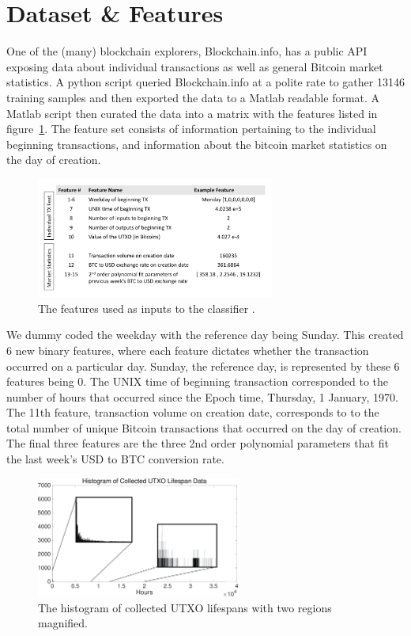 \documentclass[11pt]{article}
\begin{document}
\section{Dataset \& Features}
One of the (many) blockchain explorers, Blockchain.info, has a public API exposing data about individual transactions as well as general Bitcoin market statistics. A python script queried Blockchain.info at a polite rate to gather 13146 training samples and then exported the data to a Matlab readable format. A Matlab script then curated the data into a matrix with the features listed in figure~\ref{features}. The feature set consists of information pertaining to the individual beginning transactions, and information about the bitcoin market statistics on the day of creation.



\begin{figure}
\begin{center}
\includegraphics[width=0.7\textwidth]{figures/features}
\end{center}
\caption{The features used as inputs to the classifier .}
\label{features}
\end{figure}



We dummy coded the weekday with the reference day being Sunday. This created 6 new binary features, where each feature dictates whether the transaction occurred on a particular day. Sunday, the reference day, is represented by these 6 features being 0. The UNIX time of beginning transaction corresponded to the number of hours that occurred since the Epoch time, Thursday, 1 January, 1970. The 11th feature, transaction volume on creation date, corresponds to to the total number of unique Bitcoin transactions that occurred on the day of creation. The final three features are the three 2nd order polynomial parameters that fit the last week's USD to BTC conversion rate.


\begin{figure}
\begin{center}
\includegraphics[width=0.6\textwidth]{figures/hist.png}
\end{center}
\caption{The histogram of collected UTXO lifespans with two regions magnified.}
\label{hist}
\end{figure}
\end{document}
